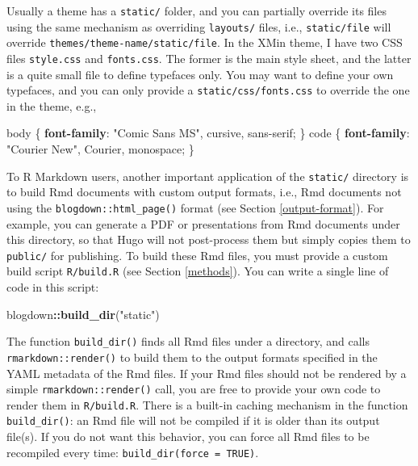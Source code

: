 \documentclass[12pt,]{krantz}
\makeatletter
\newenvironment{Shaded}{\begin{snugshade}}{\end{snugshade}}
\newcommand{\DecValTok}[1]{\textcolor[rgb]{0.00,0.00,0.81}{#1}}
\newcommand{\KeywordTok}[1]{\textcolor[rgb]{0.13,0.29,0.53}{\textbf{#1}}}
\newcommand{\NormalTok}[1]{#1}
\newcommand{\OperatorTok}[1]{\textcolor[rgb]{0.81,0.36,0.00}{\textbf{#1}}}
\newcommand{\StringTok}[1]{\textcolor[rgb]{0.31,0.60,0.02}{#1}}
\newenvironment{kframe}{%
\medskip{}
\setlength{\fboxsep}{.8em}
 \def\at@end@of@kframe{}%
 \ifinner\ifhmode%
  \def\at@end@of@kframe{\end{minipage}}%
  \begin{minipage}{\columnwidth}%
 \fi\fi%
 \def\FrameCommand##1{\hskip\@totalleftmargin \hskip-\fboxsep
 \colorbox{shadecolor}{##1}\hskip-\fboxsep
     \hskip-\linewidth \hskip-\@totalleftmargin \hskip\columnwidth}%
 \MakeFramed {\advance\hsize-\width
   \@totalleftmargin\z@ \linewidth\hsize
   \@setminipage}}%
 {\par\unskip\endMakeFramed%
 \at@end@of@kframe}
\renewenvironment{Shaded}{\begin{kframe}}{\end{kframe}}
\theoremstyle{definition}
\theoremstyle{definition}
\theoremstyle{definition}
\theoremstyle{remark}
\makeatother
\begin{document}
Usually a theme has a \texttt{static/} folder, and you can partially
override its files using the same mechanism as overriding
\texttt{layouts/} files, i.e., \texttt{static/file} will override
\texttt{themes/theme-name/static/file}. In the XMin theme, I have two
CSS files \texttt{style.css} and \texttt{fonts.css}. The former is the
main style sheet, and the latter is a quite small file to define
typefaces only. You may want to define your own typefaces, and you can
only provide a \texttt{static/css/fonts.css} to override the one in the
theme, e.g.,

\begin{Shaded}
\begin{Highlighting}[]
\NormalTok{body \{}
  \KeywordTok{font-family}\NormalTok{: }\StringTok{"Comic Sans MS"}\NormalTok{, }\DecValTok{cursive}\NormalTok{, }\DecValTok{sans-serif}\NormalTok{;}
\NormalTok{\}}
\NormalTok{code \{}
  \KeywordTok{font-family}\NormalTok{: }\StringTok{"Courier New"}\NormalTok{, Courier, }\DecValTok{monospace}\NormalTok{;}
\NormalTok{\}}
\end{Highlighting}
\end{Shaded}

To R Markdown users, another important application of the
\texttt{static/} directory is to build Rmd documents with custom output
formats, i.e., Rmd documents not using the
\texttt{blogdown::html\_page()} format (see Section
\ref{output-format}). For example, you can generate a PDF or
presentations from Rmd documents under this directory, so that Hugo will
not post-process them but simply copies them to \texttt{public/} for
publishing. To build these Rmd files, you must provide a custom build
script \texttt{R/build.R} (see Section \ref{methods}). You can write a
single line of code in this script:

\begin{Shaded}
\begin{Highlighting}[]
\NormalTok{blogdown}\OperatorTok{::}\KeywordTok{build_dir}\NormalTok{(}\StringTok{"static"}\NormalTok{)}
\end{Highlighting}
\end{Shaded}

The function \texttt{build\_dir()} finds all Rmd files under a
directory, and calls \texttt{rmarkdown::render()} to build them to the
output formats specified in the YAML metadata of the Rmd files. If your
Rmd files should not be rendered by a simple
\texttt{rmarkdown::render()} call, you are free to provide your own code
to render them in \texttt{R/build.R}. There is a built-in caching
mechanism in the function \texttt{build\_dir()}: an Rmd file will not be
compiled if it is older than its output file(s). If you do not want this
behavior, you can force all Rmd files to be recompiled every time:
\texttt{build\_dir(force\ =\ TRUE)}.
\end{document}

